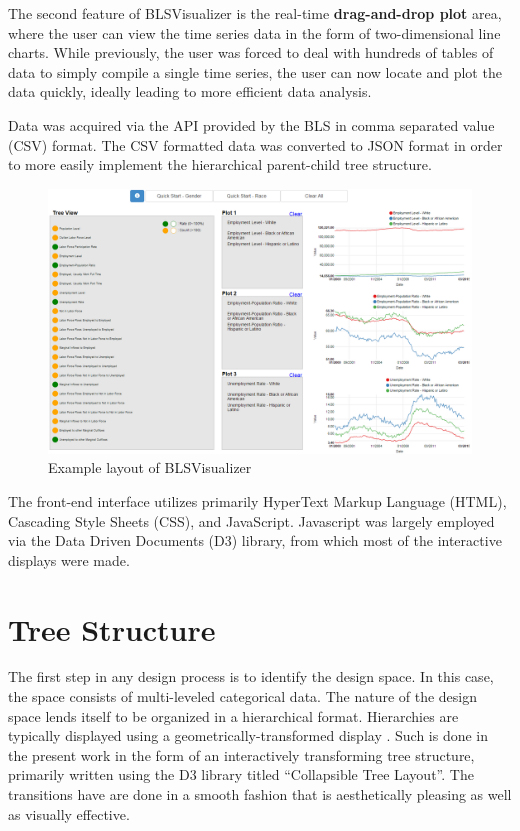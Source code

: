 \documentclass{sigchi}
\begin{document}
{The second feature of BLSVisualizer is the real-time \textbf{drag-and-drop plot} area, where the user can view the time series data in the form of two-dimensional line charts. While previously, the user was forced to deal with hundreds of tables of data to simply compile a single time series, the user can now locate and plot the data quickly, ideally leading to more efficient data analysis.

Data was acquired via the API provided by the BLS in comma separated value (CSV) format. The CSV formatted data was converted to JSON format in order to more easily implement the hierarchical parent-child tree structure.

\begin{figure}[t]
\centering
    \includegraphics[width = 6.2in]{figures/BLSVisualizer.png}
    \caption{Example layout of BLSVisualizer }
    \label{BLSVLayout}
\end{figure}

The front-end interface utilizes primarily HyperText Markup Language (HTML), Cascading Style Sheets (CSS), and JavaScript. Javascript was largely employed via the Data Driven Documents (D3) library, from which most of the interactive displays were made.

\section{Tree Structure}

The first step in any design process is to identify the design space. In this case, the space consists of multi-leveled categorical data. The nature of the design space lends itself to be organized in a hierarchical format. Hierarchies are typically displayed using a geometrically-transformed display \cite{Keim2002}. Such is done in the present work in the form of an interactively transforming tree structure, primarily written using the D3 library titled ``Collapsible Tree Layout''. The transitions have are done in a smooth fashion that is aesthetically pleasing as well as visually effective.

}
\end{document}

